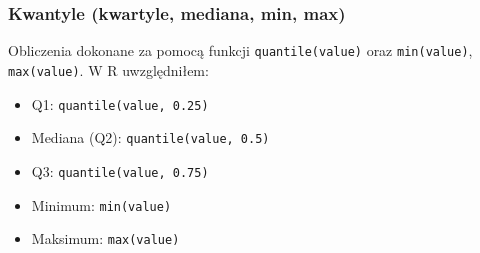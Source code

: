 \documentclass[polish]{article}
\begin{document}
    \newpage

    \subsubsection{Kwantyle (kwartyle, mediana, min, max)}

    Obliczenia dokonane za pomocą funkcji \texttt{quantile(value)} oraz \texttt{min(value)}, \texttt{max(value)}. W R uwzględniłem:

    \begin{itemize}
        \item Q1: \texttt{quantile(value, 0.25)}
        \item Mediana (Q2): \texttt{quantile(value, 0.5)}
        \item Q3: \texttt{quantile(value, 0.75)}
        \item Minimum: \texttt{min(value)}
        \item Maksimum: \texttt{max(value)}
    \end{itemize}
\end{document}
